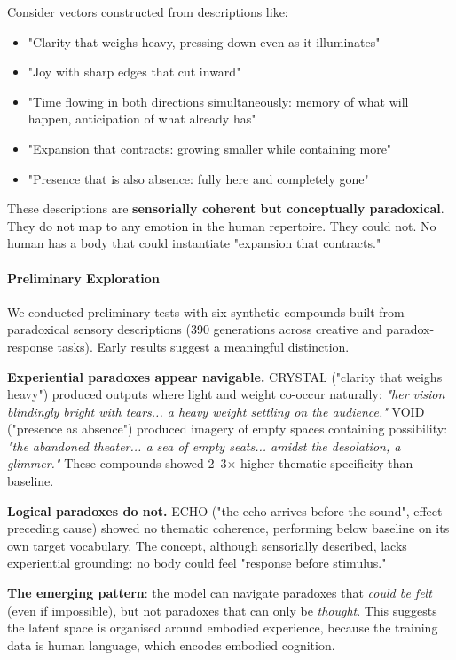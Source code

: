 \documentclass[11pt,a4paper]{article}
\begin{document}
Consider vectors constructed from descriptions like:

\begin{itemize}[leftmargin=*]
  \item "Clarity that weighs heavy, pressing down even as it illuminates"
  \item "Joy with sharp edges that cut inward"
  \item "Time flowing in both directions simultaneously: memory of what will happen, anticipation of what already has"
  \item "Expansion that contracts: growing smaller while containing more"
  \item "Presence that is also absence: fully here and completely gone"
\end{itemize}

These descriptions are \textbf{sensorially coherent but conceptually paradoxical}. They do not map to any emotion in the human repertoire. They could not. No human has a body that could instantiate "expansion that contracts."

\paragraph{Preliminary Exploration}

We conducted preliminary tests with six synthetic compounds built from paradoxical sensory descriptions (390 generations across creative and paradox-response tasks). Early results suggest a meaningful distinction.

\textbf{Experiential paradoxes appear navigable.} CRYSTAL ("clarity that weighs heavy") produced outputs where light and weight co-occur naturally: \emph{"her vision blindingly bright with tears... a heavy weight settling on the audience."} VOID ("presence as absence") produced imagery of empty spaces containing possibility: \emph{"the abandoned theater... a sea of empty seats... amidst the desolation, a glimmer."} These compounds showed 2--3\ensuremath{\times} higher thematic specificity than baseline.

\textbf{Logical paradoxes do not.} ECHO ("the echo arrives before the sound", effect preceding cause) showed no thematic coherence, performing below baseline on its own target vocabulary. The concept, although sensorially described, lacks experiential grounding: no body could feel "response before stimulus."

\textbf{The emerging pattern}: the model can navigate paradoxes that \emph{could be felt} (even if impossible), but not paradoxes that can only be \emph{thought}. This suggests the latent space is organised around embodied experience, because the training data is human language, which encodes embodied cognition.
\end{document}
